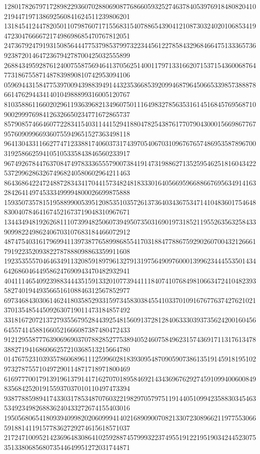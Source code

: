 \begin{DoxyCode}
      128017826797172898229360702880690877686605932527463784053976918480820410219447197138692560841624511239806201
      131845412447820501107987607171556831540788654390412108730324020106853419472304766667217498698685470767812051
      247367924791931508564447753798537997322344561227858432968466475133365736923872014647236794278700425032555899
      268843495928761240075587569464137056251400117971331662071537154360068764773186755871487839890810742953094106
      059694431584775397009439883949144323536685392099468796450665339857388878661476294434140104988899316005120767
      810358861166020296119363968213496075011164983278563531614516845769568710900299976984126326650234771672865737
      857908574664607722834154031144152941880478254387617707904300015669867767957609099669360755949651527363498118
      964130433116627747123388174060373174397054067031096767657486953587896700319258662594105105335843846560233917
      967492678447637084749783336555790073841914731988627135259546251816043422537299628632674968240580602964211463
      864368642247248872834341704415734824818333016405669596688667695634914163284264149745333499994800026699875888
      159350735781519588990053951208535103572613736403436753471410483601754648830040784641674521673719048310967671
      134434948192626811107399482506073949507350316901973185211955263563258433909982249862406703107683184466072912
      487475403161796994113973877658998685541703188477886759290260700432126661791922352093822787888098863359911608
      192353555704646349113208591897961327913197564909760001399623444553501434642686046449586247690943470482932941
      404111465409239883444351591332010773944111840741076849810663472410482393582740194493566516108846312567852977
      697346843030614624180358529331597345830384554103370109167677637427621021370135485445092630719011473184857492
      331816720721372793556795284439254815609137281284063330393735624200160456645574145881660521666087387480472433
      912129558777639069690370788285277538940524607584962315743691711317613478388271941686066257210368513215664780
      014767523103935786068961112599602818393095487090590738613519145918195102973278755710497290114871718971800469
      616977700179139196137914171627070189584692143436967629274591099400600849835684252019155937037010110497473394
      938778859894174330317853487076032219829705797511914405109942358830345463534923498268836240433272674155403016
      195056806541809394099820206099941402168909007082133072308966211977553066591881411915778362729274615618571037
      217247100952142369648308641025928874579993223749551912219519034244523075351338068568073544649951272031744871

\end{DoxyCode}
